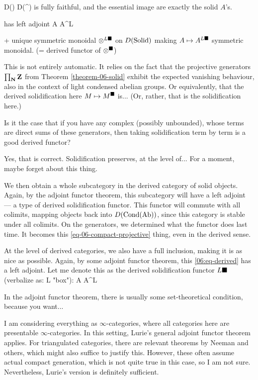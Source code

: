 \bp
\be
D(\Solid) \mono D(\Cond\Ab^\light) \label{06:eq-derived}
\ee
is fully faithful, and the essential image are exactly the solid $A$'s.

has left adjoint
\be
A \mapsto A^{L\solid} 
\ee

+ unique symmetric monoidal $\otimes^{L\blacksquare}$ on $D(\mathrm{Solid})$
making $A \mapsto A^{L\blacksquare}$ symmetric monoidal.
(= derived functor of $\otimes^\blacksquare$)
\ep

This is not entirely automatic. It relies on the fact that the projective generators $\prod_\mathbf N \mathbf Z$ from Theorem \ref{theorem-06-solid} exhibit the expected vanishing behaviour, also in the context of light condensed abelian groups. Or equivalently, that the derived solidification here $M \mapsto M^\blacksquare$ is... 
(Or, rather, that is the solidification here.)

\ques Is it the case that if you have any complex (possibly unbounded), whose terms are direct sums of these generators, then taking solidification term by term is a good derived functor? 

\ans Yes, that is correct. Solidification preserves, at the level of... For a moment, maybe forget about this thing.

We then obtain a whole subcategory in the derived category of solid objects. 
Again, by the adjoint functor theorem, this subcategory will have a left adjoint --- a type of  derived solidification functor. This functor will commute with all colimits, mapping objects back into $D(\mathrm{Cond}(\mathrm{Ab}))$, since this category is stable under all colimits.
On the generators, we determined what the functor does last time. It becomes this \ref{eq-06-compact-projective} thing, even in the derived sense.

At the level of derived categories, we also have a full inclusion, making it is as nice as possible. Again, by some adjoint functor theorem, this \ref{06:eq-derived} has a left adjoint. Let me denote this as the derived solidification functor $L\blacksquare$ (verbalize as: L "box"):
\be
A \mapsto A^{L\solid} 
\ee

\ques In the adjoint functor theorem, there is usually some set-theoretical condition, because you want...

\ans I am considering everything as $\infty$-categories, where all categories here are presentable $\infty$-categories. In this setting, Lurie's general adjoint functor theorem applies. 
For triangulated categories, there are relevant theorems by Neeman  and others, which might also suffice to justify this. 
However, these often assume actual compact generation, which is not quite true in this case, so I am not sure. Nevertheless, Lurie's version is definitely sufficient.

